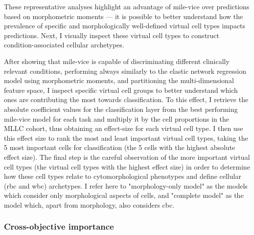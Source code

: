 \begin{figure}[!ht]
    \label{fig:heatmap-slides-vc}
\end{figure}

These representative analyses highlight an advantage of \ac{mile-vice} over predictions based on morphometric moments --- it is possible to better understand how the prevalence of specific and morphologically well-defined virtual cell types impacts predictions. Next, I visually inspect these virtual cell types to construct condition-associated cellular archetypes.

After showing that \ac{mile-vice} is capable of discriminating different clinically relevant conditions, performing always similarly to the elastic network regression model using morphometric moments, and partitioning the multi-dimensional feature space, I inspect specific virtual cell groups to better understand which ones are contributing the most towards classification. To this effect, I retrieve the absolute coefficient values for the classification layer from the best performing \ac{mile-vice} model for each task and multiply it by the cell proportions in the MLLC cohort, thus obtaining an effect-size for each virtual cell type. I then use this effect size to rank the most and least important virtual cell types, taking the 5 most important cells for classification (the 5 cells with the highest absolute effect size). The final step is the careful observation of the more important virtual cell types (the virtual cell types with the highest effect size) in order to determine how these cell types relate to cytomorphological phenotypes and define cellular (\ac{rbc} and \ac{wbc}) archetypes. I refer here to "morphology-only model" as the models which consider only morphological aspects of cells, and "complete model" as the model which, apart from morphology, also considers \ac{cbc}. 

\subsubsection{Cross-objective importance} 

